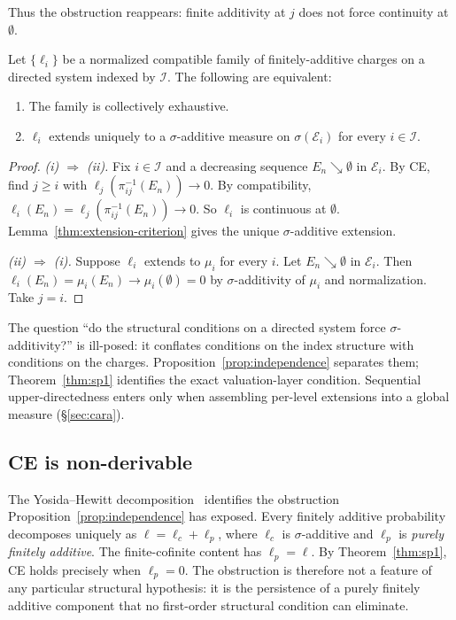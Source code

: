 Thus the obstruction reappears: finite additivity at $j$ does not force continuity at $\emptyset$.

\begin{theorem}[CE Characterisation]
\label{thm:sp1}
Let $\{\ell_i\}$ be a normalized compatible family of finitely-additive charges on a directed system indexed by $\mathcal{I}$.  The following are equivalent:
\begin{enumerate}[label=(\roman*)]
  \item The family is collectively exhaustive.
  \item $\ell_i$ extends uniquely to a $\sigma$-additive measure on
        $\sigma(\mathcal{E}_i)$ for every $i \in \mathcal{I}$.
\end{enumerate}
\end{theorem}

\begin{proof}
\emph{(i) $\Rightarrow$ (ii).}
Fix $i \in \mathcal{I}$ and a decreasing sequence $E_n \searrow \emptyset$ in $\mathcal{E}_i$.  By CE, find $j \geq i$ with $\ell_j(\pi_{ij}^{-1}(E_n)) \to 0$. By compatibility, $\ell_i(E_n) = \ell_j(\pi_{ij}^{-1}(E_n)) \to 0$.  So $\ell_i$ is continuous at $\emptyset$.  Lemma~\ref{thm:extension-criterion} gives the unique $\sigma$-additive extension.

\emph{(ii) $\Rightarrow$ (i).}
Suppose $\ell_i$ extends to $\mu_i$ for every $i$.  Let $E_n \searrow \emptyset$ in $\mathcal{E}_i$.  Then $\ell_i(E_n) = \mu_i(E_n) \to \mu_i(\emptyset) = 0$ by $\sigma$-additivity of $\mu_i$ and normalization.  Take $j = i$.
\end{proof}

\noindent The question ``do the structural conditions on a directed system force
$\sigma$-additivity?'' is ill-posed: it conflates conditions on the index structure with conditions on the charges.  Proposition~\ref{prop:independence} separates them; Theorem~\ref{thm:sp1} identifies the exact valuation-layer condition.  Sequential upper-directedness enters only when assembling per-level extensions into a global measure (\S\ref{sec:cara}).

\subsection{CE is non-derivable}
\label{sec:ce-irred}

The Yosida--Hewitt decomposition~\cite{YosidaHewitt1952} identifies the obstruction Proposition~\ref{prop:independence} has exposed.  Every finitely additive probability decomposes uniquely as $\ell = \ell_c + \ell_p$, where $\ell_c$ is $\sigma$-additive and $\ell_p$ is \emph{purely finitely additive}. The finite-cofinite content has $\ell_p = \ell$.  By Theorem~\ref{thm:sp1}, CE holds precisely when $\ell_p = 0$.  The obstruction is therefore not a feature of any particular structural hypothesis: it is the persistence of a purely finitely additive component that no first-order structural condition can eliminate. 

